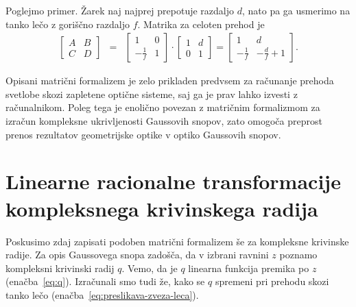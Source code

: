 Poglejmo primer. Žarek naj najprej prepotuje razdaljo $d$, nato pa ga usmerimo
na tanko lečo z goriščno razdaljo $f$. Matrika za celoten prehod je
\begin{eqnarray}
\left[\begin{array}{cc}
A & B\\
C & D
\end{array}\right] & = & \left[\begin{array}{cc}
1 & 0\\
-\frac{1}{f} & 1
\end{array}\right]\cdot\left[\begin{array}{cc}
1 & d\\
0 & 1
\end{array}\right] =  \left[\begin{array}{cc}
1 & d\\
-\frac{1}{f} & -\frac{d}{f}+1
\end{array}\right].
\label{eq:Mdf}
\end{eqnarray}
\begin{remark}
Opisani matrični formalizem je zelo prikladen predvsem za računanje prehoda
svetlobe skozi zapletene optične sisteme, saj ga je prav lahko izvesti z računalnikom. Poleg
tega je enolično povezan z matričnim formalizmom za izračun
kompleksne ukrivljenosti Gaussovih snopov, zato omogoča preprost prenos 
rezultatov geometrijske optike v optiko Gaussovih snopov.
\end{remark}

\section{Linearne racionalne transformacije kompleksnega krivinskega radija}

Poskusimo zdaj zapisati podoben matrični formalizem še za kompleksne krivinske
radije. Za opis Gaussovega snopa zadošča, da v izbrani ravnini $z$ poznamo kompleksni
krivinski radij $q$. Vemo, da je $q$ linearna funkcija
premika po $z$ (enačba~\ref{eq:q}). Izračunali smo tudi že, kako se $q$ 
spremeni pri prehodu skozi tanko lečo (enačba~\ref{eq:preslikava-zveza-leca}). 

